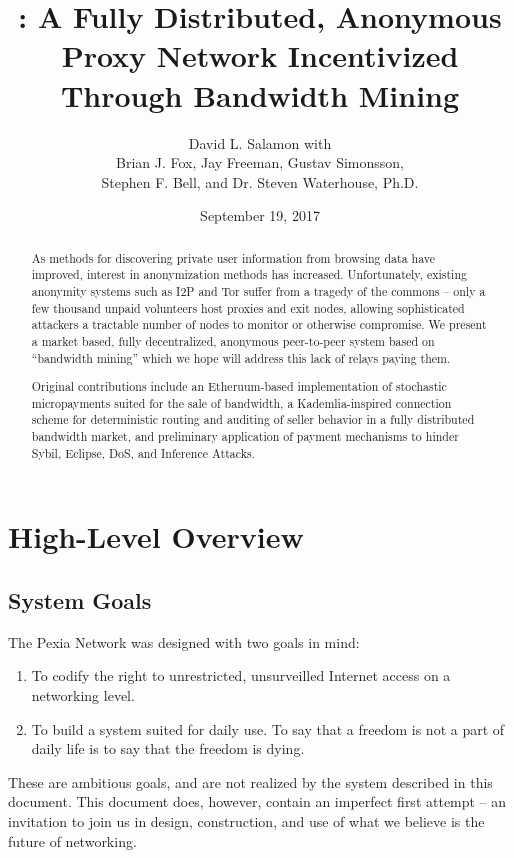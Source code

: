 \documentclass{article}
\title{\mesh{}: A Fully Distributed, Anonymous Proxy Network Incentivized Through Bandwidth Mining}
\author{{David L. Salamon with} \\ {Brian J. Fox, Jay Freeman, Gustav Simonsson,} \\ {{Stephen F. Bell, and Dr. Steven Waterhouse, Ph.D.}}}
\date{September 19, 2017}
\newcommand{\mesh}{Pexia}
\begin{document}
\maketitle

\begin{abstract}
  As methods for discovering private user information from browsing data have improved, interest in anonymization methods has increased. Unfortunately, existing anonymity systems such as I2P and Tor suffer from a tragedy of the commons – only a few thousand unpaid volunteers host proxies and exit nodes, allowing sophisticated attackers a tractable number of nodes to monitor or otherwise compromise. We present a market based, fully decentralized, anonymous peer-to-peer system based on “bandwidth mining” which we hope will address this lack of relays paying them.

  Original contributions include an Etheruum-based implementation of stochastic micropayments suited for the sale of bandwidth, a Kademlia-inspired connection scheme for deterministic routing and auditing of seller behavior in a fully distributed bandwidth market, and preliminary application of payment mechanisms to hinder Sybil, Eclipse, DoS, and Inference Attacks.
\end{abstract}


\newpage
\tableofcontents
\newpage


\section{High-Level Overview}
\label{sec:overview}

\subsection{System Goals}

The \mesh{} Network was designed with two goals in mind:

\begin{enumerate}
    \item To codify the right to unrestricted, unsurveilled Internet access on a networking level.
    \item To build a system suited for daily use. To say that a freedom is not a part of daily life is to say that the freedom is dying.
\end{enumerate}

These are ambitious goals, and are not realized by the system described in this document. This document does, however, contain an imperfect first attempt – an invitation to join us in design, construction, and use of what we believe is the future of networking.
\end{document}
